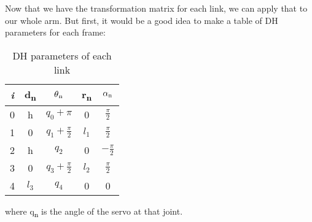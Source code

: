 \documentclass[conference]{IEEEtran}
\def\SB#1{\textsubscript{\textcolor{black}{#1}}}
\begin{document}
  Now that we have the transformation matrix for each link, we can apply that to our whole arm. But first, it would be a good idea to make a table of DH parameters for each frame:
  \begin{table}[H]
  	\centering
  	\def\arraystretch{1.5}
  	\setlength\tabcolsep{8pt}
  	\begin{tabular}{||c : c: c: c: c||} 
  		\hline
  		\textit{i} 	& d\SB{n} & $\theta\SB{n}$ &  r\SB{n} & $\alpha\SB{n}$ \\[0.5ex]
  		 & h		& $q_0+\pi$ 			& 0 	& $\frac{\pi}{2}$	\\ 
  		1 & 0 		& $q_1+\frac{\pi}{2}$ 	& $l_1$ 	& $\frac{\pi}{2}$	\\ 
  		2 & h 		& $q_2$ 				& 0 	& $-\frac{\pi}{2}$	\\
  		3 & 0 		& $q_3+\frac{\pi}{2}$ 	& $l_2$	& $\frac{\pi}{2}$	\\
  		4 & $l_3$ 	& $q_4$ 				& 0 	& 0					\\[1ex] 
  		\hline
  	\end{tabular}
  	\caption{DH parameters of each link}
  	\label{tab:dh_parameters}
  \end{table}
  where q\SB{n} is the angle of the servo at that joint.
  
\end{document}
